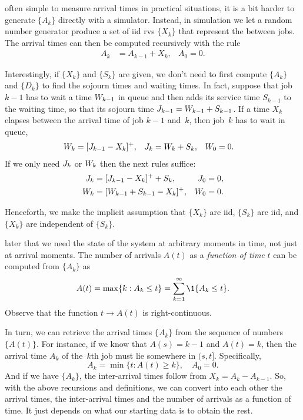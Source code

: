 \documentclass[stochastic-or.tex]{subfiles}
\begin{document}
often simple to measure arrival times in practical situations, it is a bit harder to generate $\{A_{k}\}$ directly with a simulator. Instead, in simulation we let a random number generator produce a set of iid rvs $\{X_{k}\}$ that represent the  between jobs. The arrival times can then be computed recursively with the rule
\begin{align}\label{eq:qc-4}
 A_k &= A_{k-1} + X_k, &   A_{0} = 0.
 \end{align}

Interestingly, if  $\{X_{k}\}$ and $\{S_{k}\}$ are given, we don't need to first compute $\{A_{k}\}$ and $\{D_{k}\}$  to find the sojourn times and waiting  times. In fact,
suppose that job $k-1$ has to wait a time $W_{k-1}$ in queue and then adds its service time $S_{k-1}$ to the waiting time, so that its sojourn time $J_{k-1} =W_{k-1}+ S_{k-1}$. If a time $X_k$ elapses between the arrival time of job $k-1$ and~$k$, then job~$k$ has to wait in queue,
\begin{align}\label{eq:56}
 W_{k} &= [J_{k-1} -X_k]^+, & J_{k} &= W_{k} + S_{k}, & W_{0} &= 0.
\end{align}
If we only need  $J_k$ or $W_{k}$ then the next rules suffice:
\begin{align}\label{eq:59}
J_{k} &= [J_{k-1} - X_k]^+ + S_k, & J_{0} &=0, \\
W_{k} &= [W_{k-1} + S_{k-1}- X_k]^+, & W_{0} &=0.
\end{align}

Henceforth, we  make the  implicit assumption  that  $\{X_k\}$ are iid,  $\{S_k\}$ are iid, and $\{X_k\}$ are independent of $\{S_k\}$.

 later that we need the state of the system at arbitrary moments in time, not just at arrival moments.
The number of arrivals $A(t)$ as a \emph{function of time} $t$ can be computed from $\{A_{k}\}$ as
\begin{equation} \label{eq:2}
 A(t) = \max\{k: A_k \leq t\} = \sum_{k=1}^{\infty}\1{A_k\leq t}.
\end{equation}
Observe that the function $t\to A(t)$ is right-continuous.

In turn, we can retrieve the arrival times $\{A_{k}\}$ from the sequence of numbers $\{A(t)\}$.
For instance, if we know that $A(s) = k-1$ and $A(t) = k$, then the arrival time $A_k$ of the~$k$th job must lie somewhere in $(s,t]$.
Specifically,
\begin{equation*}
 A_k = \min\{t: A(t) \geq k\}, \quad A_0 = 0.
\end{equation*}
And if we have $\{A_{k}\}$,  the inter-arrival times follow from $X_k = A_k - A_{k-1}$. So, with the above recursions and definitions, we can convert into each other the arrival times, the inter-arrival times and the number of arrivals as a function of time. It just depends on what our starting data is to obtain the rest.
\end{document}
